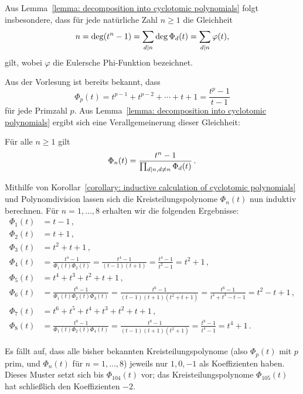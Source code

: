 \begin{remark}
  Aus Lemma~\ref{lemma: decomposition into cyclotomic polynomials} folgt insbesondere, dass für jede natürliche Zahl $n \geq 1$ die Gleichheit
  \[
      n
    = \deg(t^n - 1)
    = \sum_{d \mathrel{|} n} \deg \Phi_d(t)
    = \sum_{d \mathrel{|} n} \varphi(t),
  \]
  gilt, wobei $\varphi$ die Eulersche Phi-Funktion bezeichnet.
\end{remark}

Aus der Vorlesung ist bereits bekannt, dass
\[
    \Phi_p(t)
  = t^{p-1} + t^{p-2} + \dotsb + t + 1
  = \frac{t^p - 1}{t-1}
\]
für jede Primzahl $p$.
Aus Lemma~\ref{lemma: decomposition into cyclotomic polynomials} ergibt sich eine Verallgemeinerung dieser Gleichheit:

\begin{corollary}
  \label{corollary: inductive calculation of cyclotomic polynomials}
  Für alle $n \geq 1$ gilt
  \[
      \Phi_n(t)
    = \frac{t^n - 1}{\prod_{d \mathrel{|} n, d \neq n} \Phi_d(t)}\,.
  \]
\end{corollary}

Mithilfe von Korollar~\ref{corollary: inductive calculation of cyclotomic polynomials} und Polynomdivision lassen sich die Kreisteilungspolynome $\Phi_n(t)$ nun induktiv berechnen.
Für $n = 1, \dotsc, 8$ erhalten wir die folgenden Ergebnisse:
\begin{align*}
      \Phi_1(t)
  &=  t-1\,,
  \\
      \Phi_2(t)
  &=  t+1\,,
  \\
      \Phi_3(t)
  &=  t^2 + t + 1\,,
  \\
      \Phi_4(t)
  &=  \frac{t^4 - 1}{\Phi_1(t) \Phi_2(t)}
   =  \frac{t^4 - 1}{(t-1)(t+1)}
   =  \frac{t^4 - 1}{t^2 - 1}
   =  t^2 + 1\,,
  \\
      \Phi_5(t)
  &=  t^4 + t^3 + t^2 + t + 1\,,
  \\
      \Phi_6(t)
  &=  \frac{t^6 - 1}{\Phi_1(t) \Phi_2(t) \Phi_3(t)}
   =  \frac{t^6 - 1}{(t-1)(t+1)(t^2 + t + 1)}
   =  \frac{t^6 - 1}{t^4 + t^3 - t - 1}
   =  t^2 - t + 1\,,
  \\
      \Phi_7(t)
  &=  t^6 + t^5 + t^4 + t^3 + t^2 + t + 1\,,
  \\
      \Phi_8(t)
  &=  \frac{t^8 - 1}{\Phi_1(t) \Phi_2(t) \Phi_4(t)}
   =  \frac{t^8 - 1}{(t-1)(t+1)(t^2 + 1)}
   =  \frac{t^8 - 1}{t^4 - 1}
   =  t^4 +1\,.
\end{align*}

\begin{remark}
  Es fällt auf, dass alle bisher bekannten Kreisteilungspolynome (also $\Phi_p(t)$ mit $p$ prim, und $\Phi_n(t)$ für $n = 1, \dotsc, 8$) jeweils nur $1, 0, -1$ als Koeffizienten haben.
  Dieses Muster setzt sich bis $\Phi_{104}(t)$ vor; das Kreisteilungspolynome $\Phi_{105}(t)$ hat schließlich den Koeffizienten $-2$.
\end{remark}





